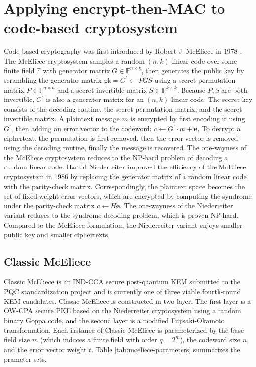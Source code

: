 \documentclass[runningheads]{llncs}
\newcommand{\pk}{\texttt{pk}}
\begin{document}
\section{Applying encrypt-then-MAC to code-based cryptosystem}\label{sec:application-to-mceliece}
Code-based cryptography was first introduced by Robert J. McEliece in 1978 \cite{McEliece1978}. The McEliece cryptosystem samples a random $(n, k)$-linear code over some finite field $\mathbb{F}$ with generator matrix $G \in \mathbb{F}^{n \times k}$, then generates the public key by scrambling the generator matrix $\pk = G^\prime \leftarrow PGS$ using a secret permutation matrix $P \in \mathbb{F}^{n \times n}$ and a secret invertible matrix $S\in\mathbb{F}^{k \times k}$. Because $P, S$ are both invertible, $G^\prime$ is also a generator matrix for an $(n, k)$-linear code. The secret key consists of the decoding routine, the secret permutation matrix, and the secret invertible matrix. A plaintext message $m$ is encrypted by first encoding it using $G^\prime$, then adding an error vector to the codeword: $c \leftarrow G^\prime\cdot m + \mathbf{e}$. To decrypt a ciphertext, the permutation is first removed, then the error vector is removed using the decoding routine, finally the message is recovered. The one-wayness of the McEliece cryptosystem reduces to the NP-hard problem of decoding a random linear code. Harald Niederreiter improved the efficiency of the McEliece cryptosystem in 1986 \cite{Niederreiter1986} by replacing the generator matrix of a random linear code with the parity-check matrix. Correspondingly, the plaintext space becomes the set of fixed-weight error vectors, which are encrypted by computing the syndrome under the parity-check matrix $c \leftarrow H\mathbf{e}$. The one-wayness of the Niederreiter variant reduces to the syndrome decoding problem, which is proven NP-hard. Compared to the McEliece formulation, the Niederreiter variant enjoys smaller public key and smaller ciphertexts.

\subsection{Classic McEliece}\label{sec:classic-mceliece}
Classic McEliece \cite{ClassicMcEliece2022} is an IND-CCA secure post-quantum KEM submitted to the PQC standardization project and is currently one of three viable fourth-round KEM candidates. Classic McEliece is constructed in two layer. The first layer is a OW-CPA secure PKE based on the Niederreiter cryptosystem using a random binary Goppa code, and the second layer is a modified Fujisaki-Okamoto transformation. Each instance of Classic McEliece is parameterized by the base field size $m$ (which induces a finite field with order $q = 2^m$), the codeword size $n$, and the error vector weight $t$. Table \ref{tab:mceliece-parameters} summarizes the prameter sets.
\end{document}
